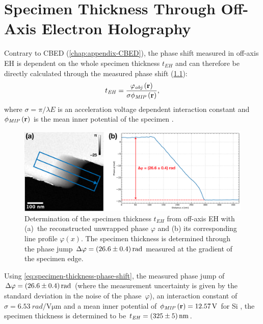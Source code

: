 \chapter{Specimen Thickness Through Off-Axis Electron Holography} \label{chap:appendix-specimen-thickness-off-axis-EH}
Contrary to CBED (\cref{chap:appendix-CBED}), the phase shift measured in off-axis EH is dependent on the whole specimen thickness $t_{\mathit{EH}}$ and can therefore be directly calculated through the measured phase shift (\cref{fig:pn-junction-thickness-off-axis-EH}):
\begin{equation}
  \label{eq:specimen-thickness-phase-shift}
  t_{\mathit{EH}} = \frac{\varphi_{\mathit{obj}}\left(\vb{r}\right)}{\sigma \phi_{\mathit{MIP}}\left(\vb{r}\right)},
\end{equation}
where $\sigma = \pi / \lambda E$ is an acceleration voltage dependent interaction constant and $\phi_{\mathit{MIP}}\left(\vb{r}\right)$ is the mean inner potential of the specimen \cite{Voelkl1999,Lehmann2002,Lichte2008}.
\begin{figure}[H]
  \centering
  \includegraphics[width=\textwidth]{Figures/Specimen/pn-Junction/off-axis-EH-thickness.pdf}
  \caption{Determination of the specimen thickness $t_{\mathit{EH}}$ from off-axis EH with (a)~the reconstructed unwrapped phase $\varphi$ and (b) its corresponding line profile $\varphi\left(x\right)$. The specimen thickness is determined through the phase jump $\Delta \varphi = \SI{26.6 \pm 0.4}{rad}$ measured at the gradient of the specimen edge.}
  \label{fig:pn-junction-thickness-off-axis-EH}
\end{figure}
Using \cref{eq:specimen-thickness-phase-shift}, the measured phase jump of $\Delta \varphi = \SI{26.6 \pm 0.4}{rad}$ (where the measurement uncertainty is given by the standard deviation in the noise of the phase~$\varphi$), an interaction constant of $\sigma = \SI{6.53}{rad \per \volt \um}$ \cite{Beleggia2014} and a mean inner potential of $\phi_{\mathit{MIP}}\left(\vb{r}\right) = \SI{12.57}{\volt}$ for Si \cite{Kruse2006}, the specimen thickness is determined to be $t_{\mathit{EH}} = \SI{325 \pm 5}{\nm}$.
